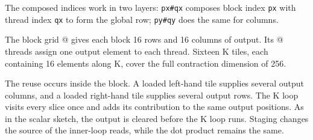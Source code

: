 The composed indices work in two layers: \texttt{px\#qx} composes block index \texttt{px} with thread index \texttt{qx} to form the global row; \texttt{py\#qy} does the same for columns.

The block grid \co@[8, 16]@ gives each block 16 rows and 16 columns of output. Its \co@[16, 16]@ threads assign one output element to each thread. Sixteen K tiles, each containing 16 elements along K, cover the full contraction dimension of 256.

The reuse occurs inside the block. A loaded left-hand tile supplies several output columns, and a loaded right-hand tile supplies several output rows. The K loop visits every slice once and adds its contribution to the same output positions. As in the scalar sketch, the output is cleared before the K loop runs. Staging changes the source of the inner-loop reads, while the dot product remains the same.
